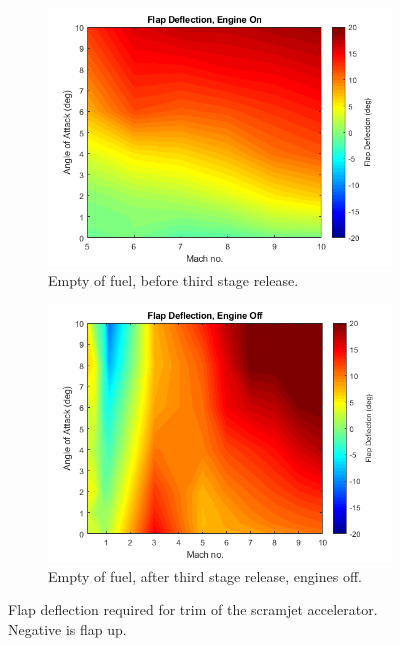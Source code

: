 \begin{figure}[!ht]
\begin{subfigure}{.5\textwidth}
			\end{subfigure}
			\begin{subfigure}{.5\textwidth}
				\centering
				\includegraphics[width=0.99\linewidth]{figures/3_vehicle_design/FlapEngineCG3}
				\caption{Empty of fuel, before third stage release.}
				
			\end{subfigure}
			\begin{subfigure}{.5\textwidth}
				\centering
				\includegraphics[width=0.99\linewidth]{figures/3_vehicle_design/FlapNoEngineCG4}
				\caption{Empty of fuel, after third stage release, engines off.}
				
			\end{subfigure}
			\caption{Flap deflection required for trim of the scramjet accelerator. Negative is flap up.} %
			\label{fig:FlapDeflection}
		\end{figure}
